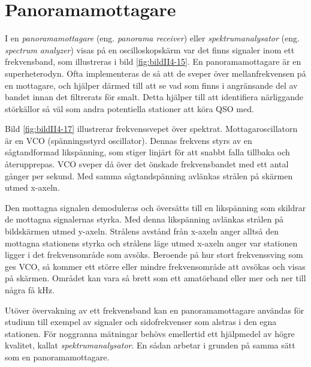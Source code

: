 \section{Panoramamottagare}


I en \emph{panoramamottagare} (eng. \emph{panorama receiver}) eller
\emph{spektrumanalysator} (eng. \emph{spectrum analyzer}) visas på en
oscilloskopskärm var det finns signaler inom ett frekvensband, som illustreras
i bild \ref{fig:bildII4-15}.
En panoramamottagare är en superheterodyn.
Ofta implementeras de så att de sveper över mellanfrekvensen på en mottagare,
och hjälper därmed till att se vad som finns i angränsande del av bandet innan
det filtrerats för smalt.
Detta hjälper till att identifiera närliggande störkällor så väl som andra
potentiella stationer att köra QSO med.


Bild \ref{fig:bildII4-17} illustrerar frekvenssvepet över spektrat.
Mottagaroscillatorn är en VCO (spänningsstyrd oscillator).
Dennas frekvens styrs av en sågtandformad likspänning, som stiger linjärt för
att snabbt falla tillbaka och återupprepas.
VCO sveper då över det önskade frekvensbandet med ett antal gånger per sekund.
Med samma sågtandspänning avlänkas strålen på skärmen utmed x-axeln.

Den mottagna signalen demoduleras och översätts till en likspänning
som skildrar de mottagna signalernas styrka.
Med denna likspänning avlänkas strålen på bildskärmen utmed y-axeln.
Strålens avstånd från x-axeln anger alltså den mottagna stationens styrka
och strålens läge utmed x-axeln anger var stationen ligger i det
frekvensområde som avsöks.
Beroende på hur stort frekvenssving som ges VCO, så kommer ett större eller
mindre frekvensområde att avsökas och visas på skärmen.
Området kan vara så brett som ett amatörband eller mer och ner till några
få \si{\kilo\hertz}.

Utöver övervakning av ett frekvensband kan en panoramamottagare användas för
studium till exempel av signaler och sidofrekvenser som alstras i den egna stationen.
För noggranna mätningar behövs emellertid ett hjälpmedel av högre kvalitet,
kallat \emph{spektrumanalysator}.
En sådan arbetar i grunden på samma sätt som en panoramamottagare.

